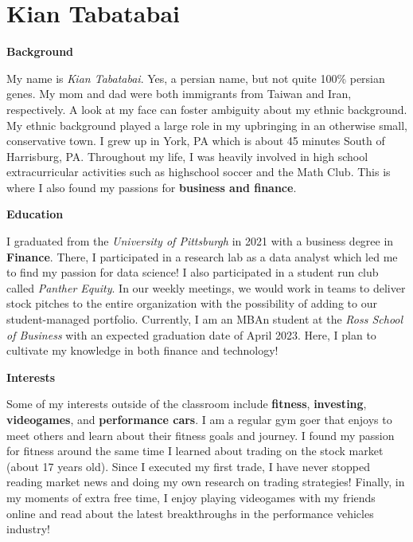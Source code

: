 \documentclass[
]{book}
\begin{document}
\hypertarget{kian-tabatabai}{%
\section{Kian Tabatabai}\label{kian-tabatabai}}

\textbf{Background}

My name is \emph{Kian Tabatabai}. Yes, a persian name, but not quite 100\% persian genes. My mom and dad were both immigrants from Taiwan and Iran, respectively. A look at my face can foster ambiguity about my ethnic background. My ethnic background played a large role in my upbringing in an otherwise small, conservative town. I grew up in York, PA which is about 45 minutes South of Harrisburg, PA. Throughout my life, I was heavily involved in high school extracurricular activities such as highschool soccer and the Math Club. This is where I also found my passions for \textbf{business and finance}.

\textbf{Education}

I graduated from the \emph{University of Pittsburgh} in 2021 with a business degree in \textbf{Finance}. There, I participated in a research lab as a data analyst which led me to find my passion for data science! I also participated in a student run club called \emph{Panther Equity}. In our weekly meetings, we would work in teams to deliver stock pitches to the entire organization with the possibility of adding to our student-managed portfolio. Currently, I am an MBAn student at the \emph{Ross School of Business} with an expected graduation date of April 2023. Here, I plan to cultivate my knowledge in both finance and technology!

\textbf{Interests}

Some of my interests outside of the classroom include \textbf{fitness}, \textbf{investing}, \textbf{videogames}, and \textbf{performance cars}. I am a regular gym goer that enjoys to meet others and learn about their fitness goals and journey. I found my passion for fitness around the same time I learned about trading on the stock market (about 17 years old). Since I executed my first trade, I have never stopped reading market news and doing my own research on trading strategies! Finally, in my moments of extra free time, I enjoy playing videogames with my friends online and read about the latest breakthroughs in the performance vehicles industry!
\end{document}
